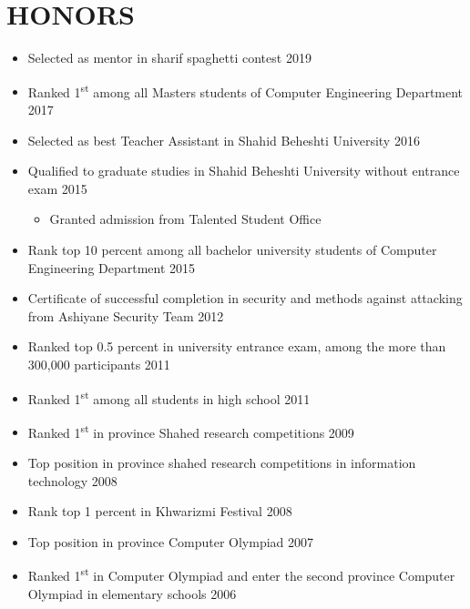 \documentclass[10pt,a4paper,sans]{moderncv} %
\begin{document}
	\section{HONORS}
	\begin{itemize}
		\item Selected as mentor in sharif spaghetti contest \hfill 2019

		\item Ranked 1\textsuperscript{st} among all Masters students of Computer Engineering Department \hfill 2017
		
		\item Selected as best Teacher Assistant in Shahid Beheshti University \hfill 2016
		
		\item Qualified to graduate studies in Shahid Beheshti University without entrance exam \hfill 2015		
		\begin{itemize}
			\item Granted admission from Talented Student Office
		\end{itemize}

		\item Rank top 10 percent  among all bachelor university students of Computer Engineering Department  \hfill 2015	
		
		\item Certificate of successful completion in  security and methods against attacking from Ashiyane Security Team \hfill 2012 
		
		\item Ranked top 0.5 percent  in university entrance exam, among the more than 300,000 participants \hfill 2011 
		\item Ranked 1\textsuperscript{st} among all students in high school \hfill 2011

		\item Ranked 1\textsuperscript{st} in province Shahed research competitions \hfill 2009
		
		\item Top position in province shahed research competitions in information technology \hfill 2008 

		\item Rank top 1 percent in Khwarizmi Festival \hfill 2008 
		\item Top position in province Computer Olympiad \hfill 2007 

		\item Ranked 1\textsuperscript{st} in Computer Olympiad and enter the second province Computer Olympiad in elementary schools \hfill 2006
	\end{itemize}
	
\end{document}
